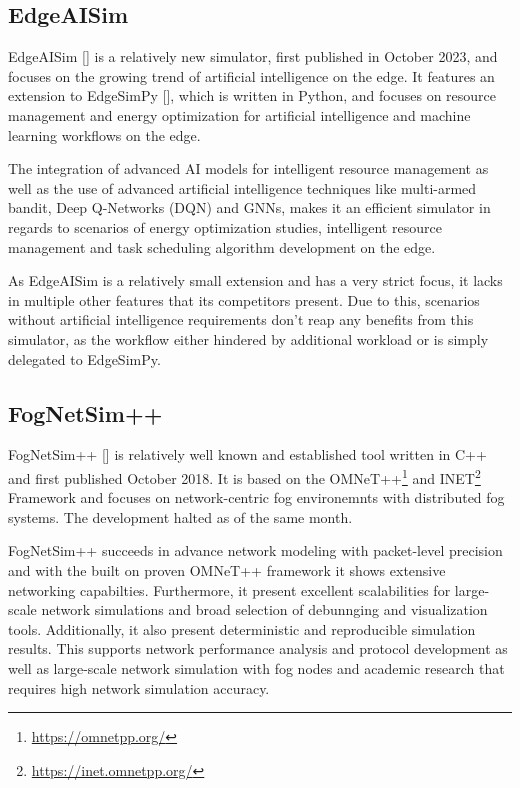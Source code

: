 \subsection{EdgeAISim}
EdgeAISim [\cite{sim-edgeAIsim}] is a relatively new simulator, first published in October 2023, and focuses on the growing trend of artificial intelligence on the edge.
It features an extension to EdgeSimPy [\cite{sim-base-edgeSimpy}], which is written in Python, and focuses on resource management and energy optimization for artificial intelligence and machine learning workflows on the edge.

The integration of advanced AI models for intelligent resource management as well as the use of advanced artificial intelligence techniques like multi-armed bandit, Deep Q-Networks (DQN) and GNNs, makes it an 
efficient simulator in regards to scenarios of energy optimization studies, intelligent resource management and task scheduling algorithm development on the edge.

As EdgeAISim is a relatively small extension and has a very strict focus, it lacks in multiple other features that its competitors present.
Due to this, scenarios without artificial intelligence requirements don't reap any benefits from this simulator, as the workflow either hindered by additional workload or is simply 
delegated to EdgeSimPy.

\subsection{FogNetSim++}
FogNetSim++ [\cite{sim-fognetsim++}] is relatively well known and established tool written in C++ and first published October 2018.
It is based on the OMNeT++\footnote{\url{https://omnetpp.org/}} and INET\footnote{\url{https://inet.omnetpp.org/}} Framework and focuses on network-centric fog environemnts with distributed fog systems.
The development halted as of the same month.

FogNetSim++ succeeds in advance network modeling with packet-level precision and with the built on proven OMNeT++ framework it shows extensive networking capabilties.
Furthermore, it present excellent scalabilities for large-scale network simulations and broad selection of debunnging and visualization tools.
Additionally, it also present deterministic and reproducible simulation results.
This supports network performance analysis and protocol development as well as large-scale network simulation with fog nodes and academic research that requires high network simulation accuracy.

